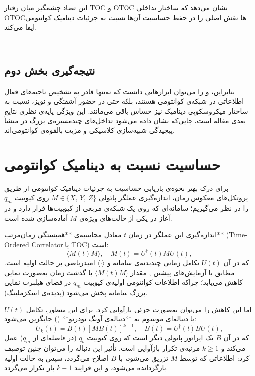 این تضاد چشمگیر میان رفتار TOC و OTOC نشان می‌دهد که ساختار تداخلی OTOCها نقش اصلی را در حفظ حساسیت آن‌ها نسبت به جزئیات دینامیک کوانتومی ایفا می‌کند.

---

\subsection{نتیجه‌گیری بخش دوم}

بنابراین،  و  را می‌توان ابزارهایی دانست که نه‌تنها قادر به تشخیص ناحیه‌های فعال اطلاعاتی در شبکه‌ی کوانتومی هستند، بلکه حتی در حضور آشفتگی و نویز، نسبت به ساختار میکروسکوپی دینامیک نیز حساس باقی می‌مانند. این ویژگی پایه‌ی نظری نتایج بعدی مقاله است، جایی‌که نشان داده می‌شود تداخل‌های چندمسیره‌ی بزرگ در  منشأ پیچیدگی شبیه‌سازی کلاسیکی و مزیت بالقوه‌ی کوانتومی‌اند.

\section{حساسیت  نسبت به دینامیک کوانتومی}
\label{sec:sensitivity}

برای درک بهتر نحوه‌ی بازیابی حساسیت به جزئیات دینامیک کوانتومی از طریق پروتکل‌های معکوس زمان، اندازه‌گیری عملگر پائولی 
\( M \in \{X,\, Y,\, Z\} \) 
روی کیوبیت \( q_m \) را در نظر می‌گیریم؛ سامانه‌ای که روی یک شبکه‌ی مربعی از کیوبیت‌ها قرار دارد و در آغاز در یکی از حالت‌های ویژه‌ی \( M \) آماده‌سازی شده است. 

اندازه‌گیری این عملگر در زمان \( t \) معادل محاسبه‌ی **همبستگی زمان‌مرتب** (Time-Ordered Correlator یا TOC) است:
\[
\langle M(t) M \rangle, \quad M(t) = U^\dagger(t) M U(t),
\]
که در آن \( U(t) \) تکامل زمانی چند‌بدنه‌ی سامانه و \( \langle \cdot \rangle \) امیدریاضی بر حالت اولیه است.  
مطابق با آزمایش‌های پیشین \cite{Kaufman2016, Zhang2023}, مقدار \(\langle M(t) M \rangle\) با گذشت زمان به‌صورت نمایی کاهش می‌یابد؛ چراکه اطلاعات کوانتومی اولیه‌ی کیوبیت \( q_m \) در فضای هیلبرت نمایی بزرگ سامانه پخش می‌شود (پدیده‌ی اسکرَملینگ).

اما این کاهش را می‌توان به‌صورت جزئی بازآوایی کرد. برای این منظور، تکامل \( U(t) \) با دنباله‌ای موسوم به **دنباله‌ی آونگ تودرتو** () جایگزین می‌شود:
\[
U_k(t) = B(t) [M B(t)]^{k-1}, \quad B(t) = U^\dagger(t) B U(t),
\]
که در آن \( B \) یک اپراتور پائولی دیگر است که روی کیوبیت \( q_b \) (در فاصله‌ای از \( q_m \)) عمل می‌کند و \( k \ge 1 \) مرتبه‌ی تکرار بازآوایی است.  
تأثیر این دنباله را می‌توان چنین توصیف کرد: اطلاعاتی که توسط \( M \) تزریق می‌شود، با \( B \) اصلاح می‌گردد، سپس به حالت اولیه بازگردانده می‌شود، و این فرایند \( k-1 \) بار تکرار می‌گردد.

